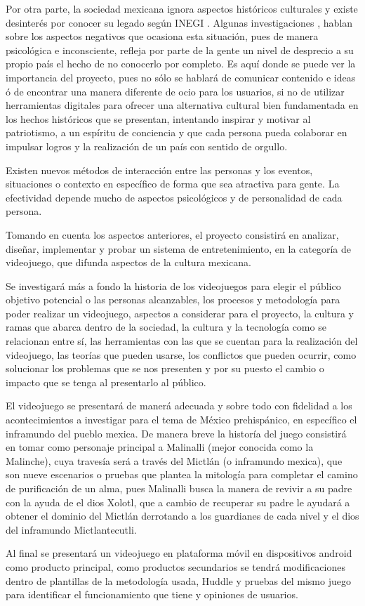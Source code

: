 Por otra parte, la sociedad mexicana ignora aspectos históricos culturales y existe desinterés por conocer su legado
según INEGI \cite{inegi2017}. Algunas investigaciones \cite{guillermobonfilbatalla1987}, hablan sobre los aspectos negativos que 
ocasiona esta situación, pues de manera psicológica e inconsciente, refleja por parte de la gente un nivel de desprecio
a su propio país el hecho de no conocerlo por completo. Es aquí donde se puede ver la importancia del proyecto, pues no
sólo se hablará de comunicar contenido e ideas ó de encontrar una manera diferente de ocio para los usuarios, 
si no de utilizar herramientas digitales para %
ofrecer una alternativa cultural bien fundamentada en los hechos históricos que se presentan, intentando inspirar y motivar al patriotismo, 
a un espíritu de conciencia y que cada persona pueda colaborar en impulsar logros y la realización 
de un país con sentido de orgullo.

Existen nuevos métodos de interacción entre las personas y los eventos, situaciones o contexto en específico de forma 
que sea atractiva para gente. La efectividad depende mucho de aspectos psicológicos y de personalidad de cada persona.

Tomando en cuenta los aspectos anteriores, el proyecto consistirá en %
analizar, diseñar, implementar y probar un sistema de entretenimiento, en la categoría de videojuego, 
que %
difunda aspectos de la cultura mexicana.

Se investigará más a fondo la historia de los videojuegos para elegir el público objetivo potencial o las personas alcanzables, los procesos y metodología para poder realizar un videojuego, aspectos a considerar para el proyecto, la cultura y ramas que abarca dentro de la sociedad, la cultura y la tecnología como se relacionan entre sí, las herramientas con las que se cuentan para la realización del videojuego, las teorías que pueden usarse, los conflictos que pueden ocurrir, como solucionar los problemas que se nos presenten y por su puesto el cambio o impacto que se tenga al presentarlo al público.

El videojuego se presentará de manerá adecuada y sobre todo con fidelidad a los acontecimientos a investigar para el tema de México prehispánico, en específico el inframundo del pueblo mexica. De manera breve la historía del juego consistirá en tomar como personaje principal a Malinalli (mejor conocida como la Malinche), cuya travesía será a través del Mictlán (o inframundo mexica), que son nueve escenarios o pruebas que plantea la mitología para completar el camino de purificación de un alma, pues Malinalli busca la manera de revivir a su padre con la ayuda de el dios Xolotl, que a cambio de recuperar su padre le ayudará a obtener el dominio del Mictlán derrotando a los guardianes de cada nivel y el dios del inframundo Mictlantecutli.

Al final se presentará un videojuego en plataforma móvil en dispositivos android como producto principal, como productos secundarios se tendrá modificaciones dentro de plantillas de la metodología usada, Huddle \cite{huddle} y pruebas del mismo juego para identificar el funcionamiento que tiene y opiniones de usuarios.